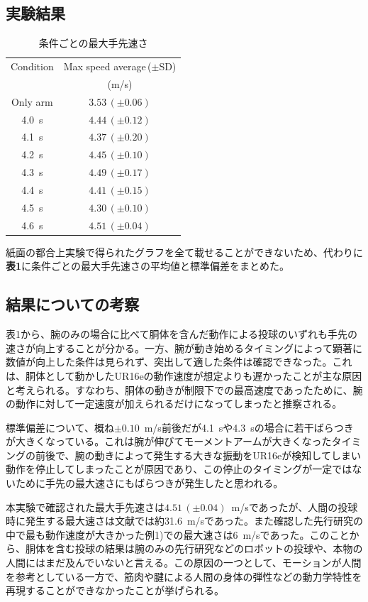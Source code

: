 \documentclass[9pt, twocolumn, a4paper]{jsarticle_kijou}
\begin{document}
\subsection{実験結果}
\begin{table}[tbp]
  \centering
  \caption{条件ごとの最大手先速さ}
  \label{tab:result_max_val}
  \begin{tabular}{cc}
    \hline
    Condition & Max speed average$\,$($\pm$SD)\\
     & (m/s)\\
    \hline
    Only arm & $3.53\,(\pm0.06)$\\
    4.0~s & $4.44\,(\pm0.12)$\\
    4.1~s & $4.37\,(\pm0.20)$\\
    4.2~s & $4.45\,(\pm0.10)$\\
    4.3~s & $4.49\,(\pm0.17)$\\
    4.4~s & $4.41\,(\pm0.15)$\\
    4.5~s & $4.30\,(\pm0.10)$\\
    4.6~s & $4.51\,(\pm0.04)$\\
    \hline
  \end{tabular}
\end{table}
紙面の都合上実験で得られたグラフを全て載せることができないため、代わりに\textbf{表1}に条件ごとの最大手先速さの平均値と標準偏差をまとめた。\par

\subsection{結果についての考察}
表1から、腕のみの場合に比べて胴体を含んだ動作による投球のいずれも手先の速さが向上することが分かる。一方、腕が動き始めるタイミングによって顕著に数値が向上した条件は見られず、突出して適した条件は確認できなった。これは、胴体として動かしたUR16eの動作速度が想定よりも遅かったことが主な原因と考えられる。すなわち、胴体の動きが制限下での最高速度であったために、腕の動作に対して一定速度が加えられるだけになってしまったと推察される。\par
標準偏差について、概ね$\pm0.10$~m/s前後だが4.1~sや4.3~sの場合に若干ばらつきが大きくなっている。これは腕が伸びてモーメントアームが大きくなったタイミングの前後で、腕の動きによって発生する大きな振動をUR16eが検知してしまい動作を停止してしまったことが原因であり、この停止のタイミングが一定ではないために手先の最大速さにもばらつきが発生したと思われる。\par
本実験で確認された最大手先速さは$4.51\,(\pm0.04)$~m/sであったが、人間の投球時に発生する最大速さは文献では約31.6~m/sであった。また確認した先行研究の中で最も動作速度が大きかった例1)での最大速さは6~m/sであった。このことから、胴体を含む投球の結果は腕のみの先行研究などのロボットの投球や、本物の人間にはまだ及んでいないと言える。この原因の一つとして、モーションが人間を参考としている一方で、筋肉や腱による人間の身体の弾性などの動力学特性を再現することができなかったことが挙げられる。\par
\end{document}
